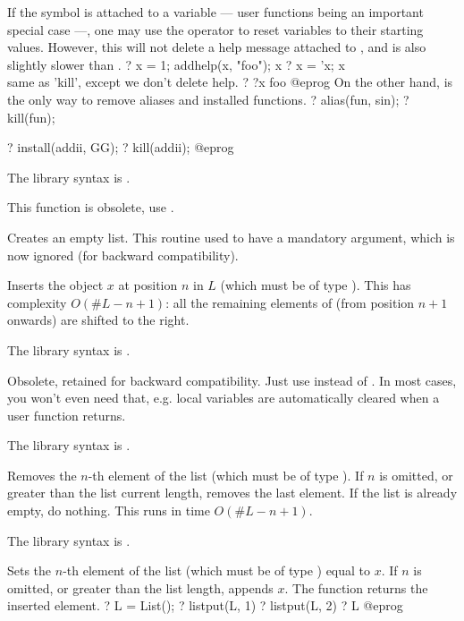 If the symbol is attached to a variable --- user functions being an
important special case ---, one may use the  operator
 to reset variables to their starting values. However, this
will not delete a help message attached to , and is also slightly
slower than .
\bprog
? x = 1; addhelp(x, "foo"); x
? x = 'x; x   \\ same as 'kill', except we don't delete help.
? ?x
foo
@eprog\noindent
On the other hand,  is the only way to remove aliases and installed
functions.
\bprog
? alias(fun, sin);
? kill(fun);

? install(addii, GG);
? kill(addii);
@eprog

The library syntax is .

\label{se:listcreate}
This function is obsolete, use .

Creates an empty list. This routine used to have a mandatory argument,
which is now ignored (for backward compatibility).

\label{se:listinsert}
Inserts the object $x$ at
position $n$ in $L$ (which must be of type ). This has
complexity $O(\#L - n + 1)$: all the
remaining elements of  (from position $n+1$ onwards) are shifted
to the right.

The library syntax is .

\label{se:listkill}
Obsolete, retained for backward compatibility. Just use 
instead of . In most cases, you won't even need that, e.g.
local variables are automatically cleared when a user function returns.

The library syntax is .

\label{se:listpop}
Removes the $n$-th element of the list
 (which must be of type ). If $n$ is omitted,
or greater than the list current length, removes the last element.
If the list is already empty, do nothing. This runs in time $O(\#L - n + 1)$.

The library syntax is .

\label{se:listput}
Sets the $n$-th element of the list
 (which must be of type ) equal to $x$. If $n$ is omitted,
or greater than the list length, appends $x$. The function returns the
inserted element.
\bprog
? L = List();
? listput(L, 1)
? listput(L, 2)
? L
@eprog

